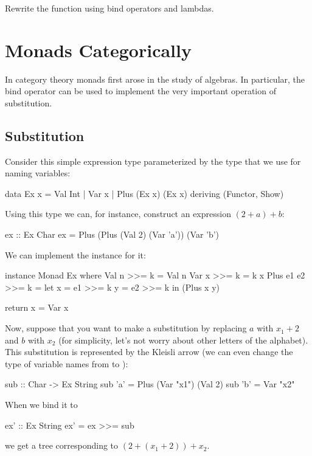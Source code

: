 \documentclass[DaoFP]{subfiles}
\begin{document}
\begin{exercise}
Rewrite the  function using bind operators and lambdas.
\end{exercise}

\section{Monads Categorically}

In category theory monads first arose in the study of algebras. In particular, the bind operator can be used to implement the very important operation of substitution. 

\subsection{Substitution}

Consider this simple expression type parameterized by the type that we use for naming variables:
\begin{haskell}
data Ex x = Val Int 
          | Var x 
          | Plus (Ex x) (Ex x) 
 deriving (Functor, Show)
\end{haskell}
Using this type we can, for instance, construct an expression $(2 + a) + b$:
\begin{haskell}
ex :: Ex Char
ex = Plus (Plus (Val 2) (Var 'a')) (Var 'b')
\end{haskell}
We can implement the  instance for it:
\begin{haskell}
instance Monad Ex where
  Val n >>= k = Val n
  Var x >>= k = k x
  Plus e1 e2 >>= k = 
    let x = e1 >>= k
        y = e2 >>= k
    in (Plus x y)
    
  return x = Var x 
\end{haskell}

Now, suppose that you want to make a substitution by replacing $a$ with $x_1 + 2$ and $b$ with $x_2$ (for simplicity, let's not worry about other letters of the alphabet). This substitution is represented by the Kleisli arrow (we can even change the type of variable names from  to ):
\begin{haskell}
sub :: Char -> Ex String
sub 'a' = Plus (Var "x1") (Val 2)
sub 'b' = Var "x2"
\end{haskell}
When we bind it to 
\begin{haskell}
ex' :: Ex String
ex' = ex >>= sub
\end{haskell}
we get a tree corresponding to $(2 + (x_1 + 2)) + x_2$.
\end{document}
